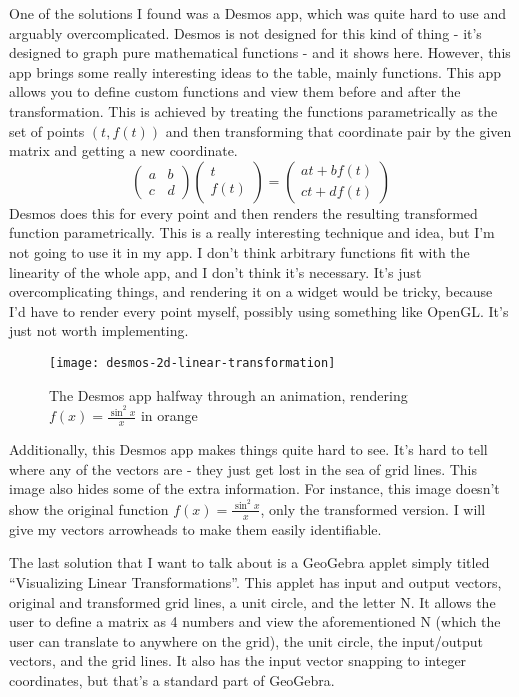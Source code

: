 \documentclass[../main.tex]{subfiles}
\begin{document}
One of the solutions I found was a Desmos app\cite{desmos-2d-linear-transformation}, which was quite hard to use and arguably overcomplicated. Desmos is not designed for this kind of thing - it's designed to graph pure mathematical functions - and it shows here. However, this app brings some really interesting ideas to the table, mainly functions. This app allows you to define custom functions and view them before and after the transformation. This is achieved by treating the functions parametrically as the set of points $(t, f(t))$ and then transforming that coordinate pair by the given matrix and getting a new coordinate.
\[\begin{pmatrix}
	a & b\\
	c & d
\end{pmatrix}
\begin{pmatrix}
	t\\
	f(t)
\end{pmatrix} = \begin{pmatrix}
	at + bf(t)\\
	ct + df(t)
\end{pmatrix}\]
Desmos does this for every point and then renders the resulting transformed function parametrically. This is a really interesting technique and idea, but I'm not going to use it in my app. I don't think arbitrary functions fit with the linearity of the whole app, and I don't think it's necessary. It's just overcomplicating things, and rendering it on a widget would be tricky, because I'd have to render every point myself, possibly using something like OpenGL. It's just not worth implementing.

\begin{figure}[h]
	\centering
	\texttt{[image: desmos-2d-linear-transformation]}
	\caption{The Desmos app halfway through an animation, rendering $f(x) = \frac{\sin^2 x}{x}$ in orange}
	\label{fig:desmos-2d-linear-transformation}
\end{figure}

Additionally, this Desmos app makes things quite hard to see. It's hard to tell where any of the vectors are - they just get lost in the sea of grid lines. This image also hides some of the extra information. For instance, this image doesn't show the original function $f(x) = \frac{\sin^2 x}{x}$, only the transformed version. I will give my vectors arrowheads to make them easily identifiable.

The last solution that I want to talk about is a GeoGebra applet simply titled \enquote{Visualizing Linear Transformations}\cite{geogebra-applet}. This applet has input and output vectors, original and transformed grid lines, a unit circle, and the letter N. It allows the user to define a matrix as 4 numbers and view the aforementioned N (which the user can translate to anywhere on the grid), the unit circle, the input/output vectors, and the grid lines. It also has the input vector snapping to integer coordinates, but that's a standard part of GeoGebra.
\end{document}
